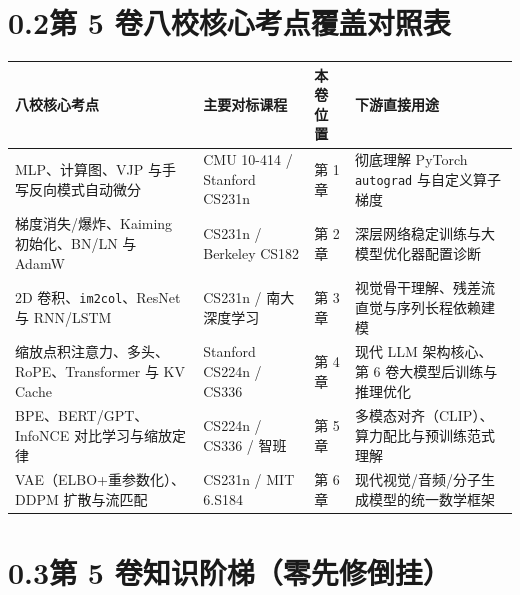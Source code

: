 \section*{0.2\quad 第 5 卷八校核心考点覆盖对照表}

\begin{center}
\footnotesize
\begin{tabularx}{\linewidth}{@{}p{34mm}p{35mm}p{15mm}X@{}}
\toprule
\textbf{八校核心考点} & \textbf{主要对标课程} & \textbf{本卷位置} & \textbf{下游直接用途} \\
\midrule
MLP、计算图、VJP 与手写反向模式自动微分 & CMU 10-414 / Stanford CS231n & 第 1 章 & 彻底理解 PyTorch \texttt{autograd} 与自定义算子梯度 \\
梯度消失/爆炸、Kaiming 初始化、BN/LN 与 AdamW & CS231n / Berkeley CS182 & 第 2 章 & 深层网络稳定训练与大模型优化器配置诊断 \\
2D 卷积、\texttt{im2col}、ResNet 与 RNN/LSTM & CS231n / 南大深度学习 & 第 3 章 & 视觉骨干理解、残差流直觉与序列长程依赖建模 \\
缩放点积注意力、多头、RoPE、Transformer 与 KV Cache & Stanford CS224n / CS336 & 第 4 章 & 现代 LLM 架构核心、第 6 卷大模型后训练与推理优化 \\
BPE、BERT/GPT、InfoNCE 对比学习与缩放定律 & CS224n / CS336 / 智班 & 第 5 章 & 多模态对齐（CLIP）、算力配比与预训练范式理解 \\
VAE（ELBO+重参数化）、DDPM 扩散与流匹配 & CS231n / MIT 6.S184 & 第 6 章 & 现代视觉/音频/分子生成模型的统一数学框架 \\
\bottomrule
\end{tabularx}
\end{center}

\section*{0.3\quad 第 5 卷知识阶梯（零先修倒挂）}

